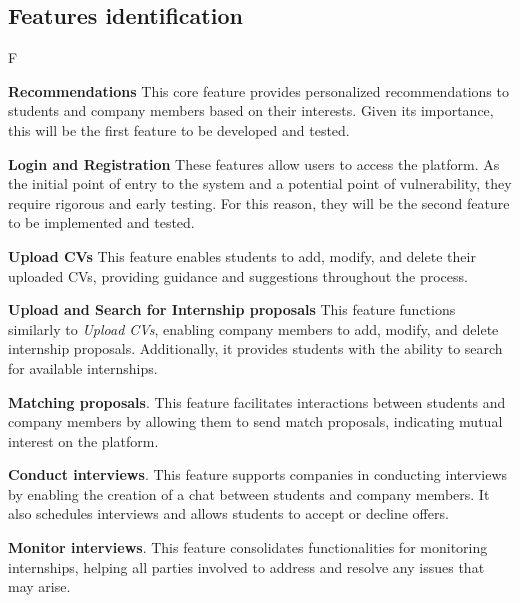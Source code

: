 \subsection{Features identification}
\begin{listoffeatures}{F}

    \item \textbf{Recommendations}
    This core feature provides personalized recommendations to students and company members based on their interests.  
    Given its importance, this will be the first feature to be developed and tested.

    \item \textbf{Login and Registration}
    These features allow users to access the platform.  
    As the initial point of entry to the system and a potential point of vulnerability, they require rigorous and early testing.  
    For this reason, they will be the second feature to be implemented and tested.

    \item \textbf{Upload CVs}
    This feature enables students to add, modify, and delete their uploaded CVs, providing guidance and suggestions throughout the process.

    \item \textbf{Upload and Search for Internship proposals} 
    This feature functions similarly to \textit{Upload CVs}, enabling company members to add, modify, and delete internship proposals.  
    Additionally, it provides students with the ability to search for available internships.
    
    \item \textbf{Matching proposals}.
    This feature facilitates interactions between students and company members by allowing them to send match proposals, indicating mutual interest on the platform.

    \item \textbf{Conduct interviews}.
    This feature supports companies in conducting interviews by enabling the creation of a chat between students and company members.  
    It also schedules interviews and allows students to accept or decline offers.

    \item \textbf{Monitor interviews}.
    This feature consolidates functionalities for monitoring internships, helping all parties involved to address and resolve any issues that may arise.
\end{listoffeatures}

